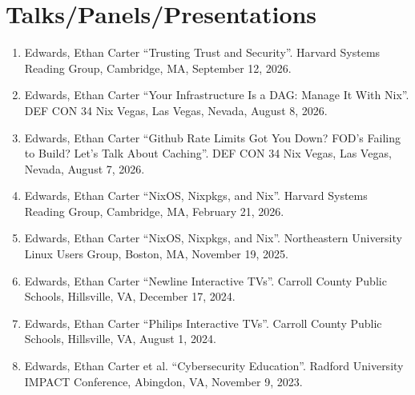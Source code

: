 \newcommand{\me}{Edwards, Ethan Carter}
\newcommand{\cambridge}{Cambridge, MA}
\newcommand{\boston}{Boston, MA}
\newcommand{\hillsville}{Hillsville, VA}
\newcommand{\lasvegas}{Las Vegas, Nevada}

\newcommand{\talk}[5]{
    \item #1 ``#2''. #3, #4, #5.
}

\section{Talks/Panels/Presentations}

\begin{enumerate}[noitemsep]
    \talk{\me}{Trusting Trust and Security}{Harvard Systems Reading Group}{\cambridge}{September 12, 2026}
    \talk{\me}{Your Infrastructure Is a DAG: Manage It With Nix}{DEF CON 34 Nix Vegas}{\lasvegas}{August 8, 2026}
    \talk{\me}{Github Rate Limits Got You Down? FOD’s Failing to Build? Let’s Talk About Caching}{DEF CON 34 Nix Vegas}{\lasvegas}{August 7, 2026}
    \talk{\me}{NixOS, Nixpkgs, and Nix}{Harvard Systems Reading Group}{\cambridge}{February 21, 2026}
    \talk{\me}{NixOS, Nixpkgs, and Nix}{Northeastern University Linux Users Group}{\boston}{November 19, 2025}
    \talk{\me}{Newline Interactive TVs}{Carroll County Public Schools}{\hillsville}{December 17, 2024}
    \talk{\me}{Philips Interactive TVs}{Carroll County Public Schools}{\hillsville}{August 1, 2024}
    \talk{{\me} et al.}{Cybersecurity Education}{Radford University IMPACT Conference}{Abingdon, VA}{November 9, 2023}
\end{enumerate}
